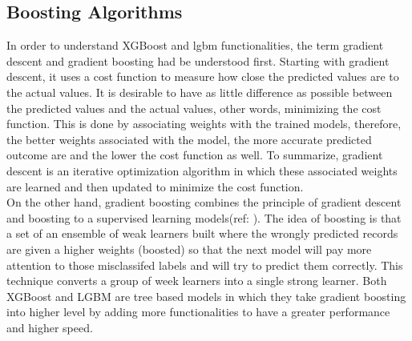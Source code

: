 \documentclass[journal,twoside,web]{ieeecolor}
\begin{document}
\subsection{Boosting Algorithms}
In order to understand XGBoost and lgbm functionalities, the term gradient descent and gradient boosting had be understood first. 
Starting with gradient descent, it uses a cost function to measure how close the predicted values are to the actual values. It is desirable to have as little difference as possible between the predicted values and the actual values, other words, minimizing the cost function. This is done by associating weights with the trained models, therefore, the better weights associated with the model, the more accurate predicted outcome are and the lower the cost function as well. To summarize, gradient descent is an iterative optimization algorithm in which these associated weights are learned and then updated to minimize the cost function. \\
On the other hand, gradient boosting combines the principle of gradient descent and boosting to a supervised learning models(ref: ). The idea of boosting is that a set of an ensemble of weak learners built where the wrongly predicted records are given a higher weights (boosted) so that the next model will pay more attention to those misclassifed labels and will try to predict them correctly. This technique converts a group of week learners into a single strong learner. Both XGBoost and LGBM are tree based models in which they take gradient boosting into higher level by adding more functionalities to have a greater performance and higher speed. 

\end{document}
